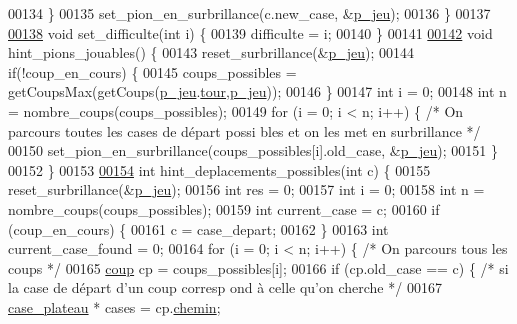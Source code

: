\begin{DoxyCode}
00134         \}
00135         set\_pion\_en\_surbrillance(c.new\_case, &\hyperlink{moteur_8h_a3efa8d0f7c65daedc584dc8db048e62c}{p_jeu});
00136 \}
00137 
\hypertarget{moteur_8c_source_l00138}{}\hyperlink{moteur_8h_a79cf9ff033c4ceaaf0834ad3e51dc37f}{00138} \textcolor{keywordtype}{void} set\_difficulte(\textcolor{keywordtype}{int} i) \{
00139         difficulte = i;
00140 \}
00141 
\hypertarget{moteur_8c_source_l00142}{}\hyperlink{moteur_8h_a269e871cb87e7db65e8b7a22914275d0}{00142} \textcolor{keywordtype}{void} hint\_pions\_jouables() \{
00143         reset\_surbrillance(&\hyperlink{moteur_8h_a3efa8d0f7c65daedc584dc8db048e62c}{p_jeu});
00144         \textcolor{keywordflow}{if}(!coup\_en\_cours) \{
00145                 coups\_possibles = getCoupsMax(getCoups(\hyperlink{moteur_8h_a3efa8d0f7c65daedc584dc8db048e62c}{p_jeu}.\hyperlink{structplateau_ab38c06b0c7e61b9eeb63b04c5e5bc652}{tour},\hyperlink{moteur_8h_a3efa8d0f7c65daedc584dc8db048e62c}{p_jeu}));
00146         \}
00147         \textcolor{keywordtype}{int} i = 0;
00148         \textcolor{keywordtype}{int} n = nombre\_coups(coups\_possibles);
00149         \textcolor{keywordflow}{for} (i = 0; i < n; i++) \{ \textcolor{comment}{/* On parcours toutes les cases de départ possi
      bles et on les met en surbrillance */}
00150                 set\_pion\_en\_surbrillance(coups\_possibles[i].old\_case, &\hyperlink{moteur_8h_a3efa8d0f7c65daedc584dc8db048e62c}{p_jeu});
00151         \}
00152 \}
00153 
\hypertarget{moteur_8c_source_l00154}{}\hyperlink{moteur_8h_ae85868ec466abc3d96eca06998a01a7d}{00154} \textcolor{keywordtype}{int} hint\_deplacements\_possibles(\textcolor{keywordtype}{int} c) \{
00155         reset\_surbrillance(&\hyperlink{moteur_8h_a3efa8d0f7c65daedc584dc8db048e62c}{p_jeu});
00156         \textcolor{keywordtype}{int} res = 0;
00157         \textcolor{keywordtype}{int} i = 0;
00158         \textcolor{keywordtype}{int} n = nombre\_coups(coups\_possibles);
00159         \textcolor{keywordtype}{int} current\_case = c;
00160         \textcolor{keywordflow}{if} (coup\_en\_cours) \{
00161                 c = case\_depart;
00162         \}
00163         \textcolor{keywordtype}{int} current\_case\_found = 0;
00164         \textcolor{keywordflow}{for} (i = 0; i < n; i++) \{ \textcolor{comment}{/* On parcours tous les coups */}
00165                 \hyperlink{structcoup}{coup} cp = coups\_possibles[i];
00166                 \textcolor{keywordflow}{if} (cp.old\_case == c) \{ \textcolor{comment}{/* si la case de départ d'un coup corresp
      ond à celle qu'on cherche */}
00167                         \hyperlink{structcase__plateau}{case_plateau} * cases = cp.\hyperlink{structcoup_aa66b88eb8140c2f459ac92fad0796510}{chemin};

\end{DoxyCode}
